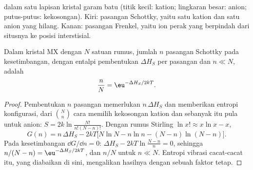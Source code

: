 \begin{omfigure}

{\small {} dalam satu lapisan kristal garam batu (titik kecil: kation;
lingkaran besar: anion; putus-putus: kekosongan). Kiri: pasangan Schottky, yaitu satu kation
dan satu anion yang hilang. Kanan: pasangan Frenkel, yaitu ion perak yang berpindah dari situsnya
ke posisi interstisial.}
\end{omfigure}

\begin{theorem}\label{thm:b3:solid-state:schottky}
Dalam kristal MX dengan $N$ satuan rumus, jumlah $n$ pasangan Schottky pada
kesetimbangan, dengan entalpi pembentukan $\Delta H_S$ per pasangan dan $n \ll N$, adalah
\[
  \frac{n}{N} = \eu^{-\Delta H_S/2kT}.
\]
\end{theorem}

\begin{proof}
Pembentukan $n$ pasangan memerlukan $n\,\Delta H_S$ dan memberikan entropi konfigurasi, dari
$\binom{N}{n}$ cara memilih kekosongan kation dan sebanyak itu pula untuk anion:
$S = 2k\ln\frac{N!}{n!(N - n)!}$. Dengan rumus Stirling $\ln x! \approx x\ln x - x$,
\[
  G(n) = n\,\Delta H_S - 2kT\bigl[N\ln N - n\ln n - (N - n)\ln(N - n)\bigr].
\]
Pada kesetimbangan $\dd G/\dd n = 0$: $\Delta H_S - 2kT\ln\frac{N - n}{n} = 0$, sehingga $n/(N - n) = \eu^{-\Delta H_S/2kT}$, dan $n/N$ untuk
$n \ll N$. Entropi vibrasi cacat-cacat itu, yang diabaikan di sini, mengalikan
hasilnya dengan sebuah faktor tetap.
\end{proof}

